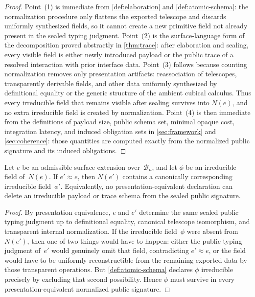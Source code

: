 \documentclass{lmcs}
\newcommand{\B}{\mathcal{B}}
\begin{document}
\begin{proof}
Point~(1) is immediate from \autoref{def:elaboration} and \autoref{def:atomic-schema}: the normalization procedure only flattens the exported telescope and discards uniformly synthesized fields, so it cannot create a new primitive field not already present in the sealed typing judgment. Point~(2) is the surface-language form of the decomposition proved abstractly in \autoref{thm:trace}: after elaboration and sealing, every visible field is either newly introduced payload or the public trace of a resolved interaction with prior interface data. Point~(3) follows because counting normalization removes only presentation artifacts: reassociation of telescopes, transparently derivable fields, and other data uniformly synthesized by definitional equality or the generic structure of the ambient cubical calculus. Thus every irreducible field that remains visible after sealing survives into $N(e)$, and no extra irreducible field is created by normalization. Point~(4) is then immediate from the definitions of payload size, public schema set, minimal opaque cost, integration latency, and induced obligation sets in \autoref{sec:framework} and \autoref{sec:coherence}: those quantities are computed exactly from the normalized public signature and its induced obligations.
\end{proof}

\begin{prop}
\label{prop:irreducible-necessary}
Let $e$ be an admissible surface extension over~$\B_n$, and let $\phi$ be an irreducible field of~$N(e)$. If $e' \approx e$, then $N(e')$ contains a canonically corresponding irreducible field~$\phi'$. Equivalently, no presentation-equivalent declaration can delete an irreducible payload or trace schema from the sealed public signature.
\end{prop}

\begin{proof}
By presentation equivalence, $e$ and $e'$ determine the same sealed public typing judgment up to definitional equality, canonical telescope isomorphism, and transparent internal normalization. If the irreducible field~$\phi$ were absent from~$N(e')$, then one of two things would have to happen: either the public typing judgment of~$e'$ would genuinely omit that field, contradicting $e' \approx e$, or the field would have to be uniformly reconstructible from the remaining exported data by those transparent operations. But \autoref{def:atomic-schema} declares $\phi$ irreducible precisely by excluding that second possibility. Hence $\phi$ must survive in every presentation-equivalent normalized public signature.
\end{proof}
\end{document}
